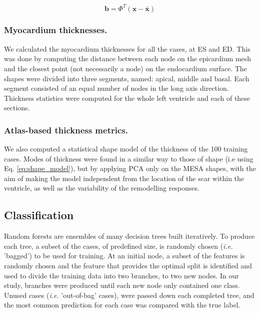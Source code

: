 \documentclass[journal]{IEEEtran}
\begin{document}
\begin{equation} \label{eq:shape_model}
\textbf{b} = \Phi^T(\textbf{x} - \bar{\textbf{x}} )
\end{equation}

\subsubsection{Myocardium thicknesses.}
We calculated the myocardium thicknesses for all the cases, at ES and ED. This was done by computing the distance between each node on the epicardium mesh and the closest point (not necessarily a node) on the endocardium surface. The shapes were divided into three segments, named: apical, middle and basal. Each segment consisted of an equal number of nodes in the long axis direction. Thickness statistics were computed for the whole left ventricle and each of these sections.
\subsubsection{Atlas-based thickness metrics.} 

We also computed a statistical shape model of the thickness of the 100 training cases. Modes of thickness were found in a similar way to those of shape (i.e using Eq. \ref{eq:shape_model}), but by applying PCA only on the MESA shapes, with the aim of making the model independent from the location of the scar within the ventricle, as well as the variability of the remodelling responses.

	
	\subsection{Classification}

\label{method:classification}

 

Random forests are ensembles of many decision trees built iteratively. To produce each tree, a subset of the cases, of predefined size, is randomly chosen (\emph{i.e.} 'bagged') to be used for training. At an initial node, a subset of the features is randomly chosen and the feature that provides the optimal split is identified and used to divide the training data into two branches, to two new nodes. In our study, branches were produced until each new node only contained one class. Unused cases (\emph{i.e.} 'out-of-bag' cases), were passed down each completed tree, and the most common prediction for each case was compared with the true label.
\end{document}
